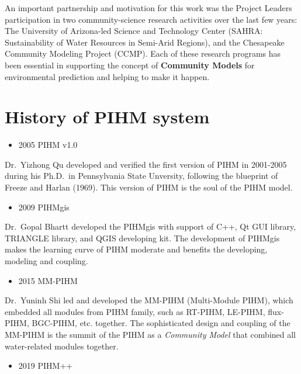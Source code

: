\documentclass[]{scrbook}
\providecommand{\tightlist}{%
  \setlength{\itemsep}{0pt}\setlength{\parskip}{0pt}}
\begin{document}
An important partnership and motivation for this work was the Project
Leaders participation in two community-science research activities over
the last few years: The University of Arizona-led Science and Technology
Center (SAHRA: Sustainability of Water Resources in Semi-Arid Regions),
and the Chesapeake Community Modeling Project (CCMP). Each of these
research programs has been essential in supporting the concept of
\textbf{Community Models} for environmental prediction and helping to
make it happen.

\section{History of PIHM system}\label{history-of-pihm-system}

\begin{itemize}
\tightlist
\item
  2005 PIHM v1.0
\end{itemize}

Dr.~Yizhong Qu \citep{Qu2007} developed and verified the first version
of PIHM in 2001-2005 during his Ph.D.~in Pennsylvania State Unversity,
following the blueprint of Freeze and Harlan (1969). This version of
PIHM is the soul of the PIHM model.

\begin{itemize}
\tightlist
\item
  2009 PIHMgis
\end{itemize}

Dr.~Gopal Bhartt \citep{Bhatt2012} developed the PIHMgis with support of
C++, Qt GUI library, TRIANGLE library, and QGIS developing kit. The
development of PIHMgis makes the learning curve of PIHM moderate and
benefits the developing, modeling and coupling.

\begin{itemize}
\tightlist
\item
  2015 MM-PIHM
\end{itemize}

Dr.~Yuninh Shi led and developed the MM-PIHM (Multi-Module PIHM), which
embedded all modules from PIHM family, such as RT-PIHM, LE-PIHM,
flux-PIHM, BGC-PIHM, etc. together. The sophisticated design and
coupling of the MM-PIHM is the summit of the PIHM as a \emph{Community
Model} that combined all water-related modules together.

\begin{itemize}
\tightlist
\item
  2019 PIHM++
\end{itemize}
\end{document}
